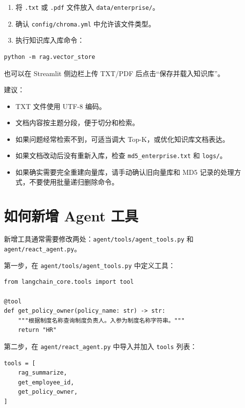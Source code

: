 \documentclass[UTF8,zihao=-4]{ctexart}
\begin{document}
\begin{enumerate}
\item 将 \texttt{.txt} 或 \texttt{.pdf} 文件放入 \texttt{data/enterprise/}。
\item 确认 \texttt{config/chroma.yml} 中允许该文件类型。
\item 执行知识库入库命令：
\end{enumerate}

\begin{Verbatim}[breaklines=true,breakanywhere=true,fontsize=\small]
python -m rag.vector_store
\end{Verbatim}

也可以在 Streamlit 侧边栏上传 TXT/PDF 后点击“保存并载入知识库”。

建议：

\begin{itemize}
\item TXT 文件使用 UTF-8 编码。
\item 文档内容按主题分段，便于切分和检索。
\item 如果问题经常检索不到，可适当调大 Top-K，或优化知识库文档表达。
\item 如果文档改动后没有重新入库，检查 \texttt{md5\_enterprise.txt} 和 \texttt{logs/}。
\item 如果确实需要完全重建向量库，请手动确认旧向量库和 MD5 记录的处理方式，不要使用批量递归删除命令。
\end{itemize}

\section{如何新增 Agent 工具}

新增工具通常需要修改两处：\texttt{agent/tools/agent\_tools.py} 和 \texttt{agent/react\_agent.py}。

第一步，在 \texttt{agent/tools/agent\_tools.py} 中定义工具：

\begin{Verbatim}[breaklines=true,breakanywhere=true,fontsize=\small]
from langchain_core.tools import tool

@tool
def get_policy_owner(policy_name: str) -> str:
    """根据制度名称查询制度负责人。入参为制度名称字符串。"""
    return "HR"
\end{Verbatim}

第二步，在 \texttt{agent/react\_agent.py} 中导入并加入 \texttt{tools} 列表：

\begin{Verbatim}[breaklines=true,breakanywhere=true,fontsize=\small]
tools = [
    rag_summarize,
    get_employee_id,
    get_policy_owner,
]
\end{Verbatim}
\end{document}
